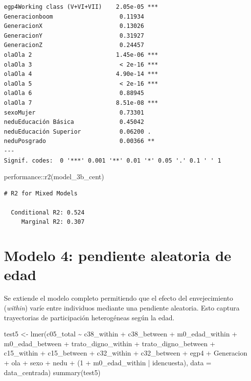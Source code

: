 \documentclass[
  spanish,
  a4paper,
  oneside]{scrbook}
\newenvironment{Shaded}{\begin{snugshade}}{\end{snugshade}}
\newcommand{\AttributeTok}[1]{\textcolor[rgb]{0.40,0.45,0.13}{#1}}
\newcommand{\DecValTok}[1]{\textcolor[rgb]{0.68,0.00,0.00}{#1}}
\newcommand{\FunctionTok}[1]{\textcolor[rgb]{0.28,0.35,0.67}{#1}}
\newcommand{\NormalTok}[1]{\textcolor[rgb]{0.00,0.23,0.31}{#1}}
\newcommand{\OtherTok}[1]{\textcolor[rgb]{0.00,0.23,0.31}{#1}}
\newcommand{\SpecialCharTok}[1]{\textcolor[rgb]{0.37,0.37,0.37}{#1}}
\begin{document}
\begin{verbatim}
egp4Working class (V+VI+VII)    2.05e-05 ***
Generacionboom                   0.11934    
GeneracionX                      0.13026    
GeneracionY                      0.31927    
GeneracionZ                      0.24457    
olaOla 2                        1.45e-06 ***
olaOla 3                         < 2e-16 ***
olaOla 4                        4.90e-14 ***
olaOla 5                         < 2e-16 ***
olaOla 6                         0.88945    
olaOla 7                        8.51e-08 ***
sexoMujer                        0.73301    
neduEducación Básica             0.45042    
neduEducación Superior           0.06200 .  
neduPosgrado                     0.00366 ** 
---
Signif. codes:  0 '***' 0.001 '**' 0.01 '*' 0.05 '.' 0.1 ' ' 1
\end{verbatim}

\begin{Shaded}
\begin{Highlighting}[]
\NormalTok{performance}\SpecialCharTok{::}\FunctionTok{r2}\NormalTok{(model\_3b\_cent)}
\end{Highlighting}
\end{Shaded}

\begin{verbatim}
# R2 for Mixed Models

  Conditional R2: 0.524
     Marginal R2: 0.307
\end{verbatim}

\section{Modelo 4: pendiente aleatoria de
edad}\label{modelo-4-pendiente-aleatoria-de-edad}

Se extiende el modelo completo permitiendo que el efecto del
envejecimiento (\emph{within}) varíe entre individuos mediante una
pendiente aleatoria. Esto captura trayectorias de participación
heterogéneas según la edad.

\begin{Shaded}
\begin{Highlighting}[]
\NormalTok{test5 }\OtherTok{\textless{}{-}} \FunctionTok{lmer}\NormalTok{(c05\_total }\SpecialCharTok{\textasciitilde{}} 
\NormalTok{                c38\_within }\SpecialCharTok{+}\NormalTok{ c38\_between }\SpecialCharTok{+}
\NormalTok{                m0\_edad\_within }\SpecialCharTok{+}\NormalTok{ m0\_edad\_between }\SpecialCharTok{+}
\NormalTok{                trato\_digno\_within }\SpecialCharTok{+}\NormalTok{ trato\_digno\_between }\SpecialCharTok{+}
\NormalTok{                c15\_within }\SpecialCharTok{+}\NormalTok{ c15\_between }\SpecialCharTok{+}
\NormalTok{                c32\_within }\SpecialCharTok{+}\NormalTok{ c32\_between }\SpecialCharTok{+}
\NormalTok{                egp4 }\SpecialCharTok{+}\NormalTok{ Generacion }\SpecialCharTok{+}\NormalTok{ ola }\SpecialCharTok{+}\NormalTok{ sexo }\SpecialCharTok{+}\NormalTok{ nedu }\SpecialCharTok{+}
\NormalTok{                (}\DecValTok{1} \SpecialCharTok{+}\NormalTok{ m0\_edad\_within }\SpecialCharTok{|}\NormalTok{ idencuesta), }\AttributeTok{data =}\NormalTok{ data\_centrada)}
\FunctionTok{summary}\NormalTok{(test5)}
\end{Highlighting}
\end{Shaded}
\end{document}
